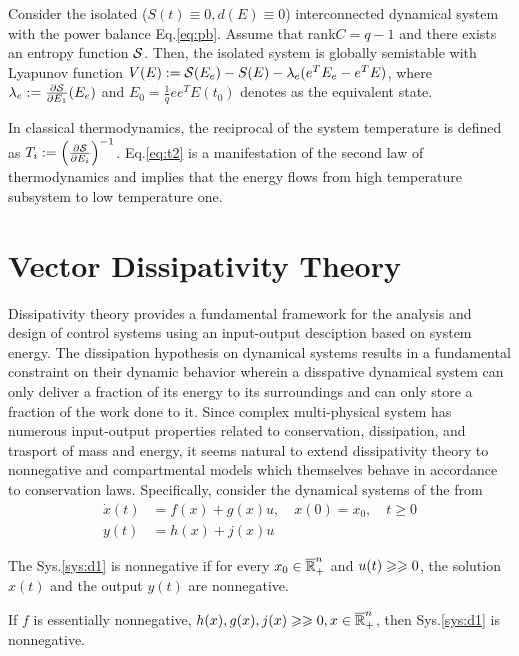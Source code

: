 \documentclass{paper}
\begin{document}
\begin{thm}
Consider the isolated ($S(t)\equiv 0, d(E)\equiv 0$) interconnected dynamical system with the power balance Eq.\ref{eq:pb}.
Assume that rank$C=q-1$ and there exists an entropy function $\mathcal{S}$. Then, the isolated system is globally semistable with
Lyapunov function $V(E):=\mathcal{S}(E_e)-S(E)-\lambda_e(e^TE_e-e^TE)$, where $\lambda_e:=\frac{\partial \mathcal{S}}{\partial E_1}(E_e)$
and $E_0=\frac{1}{q}ee^TE(t_0)$ denotes as the equivalent state.
\end{thm}
In classical thermodynamics, the reciprocal of the system temperature is defined as $T_i:=\left(\frac{\partial \mathcal{S}}
{\partial E_i}\right)^{-1}$. Eq.\ref{eq:t2} is a manifestation of the second law of thermodynamics and implies that the 
energy flows from high temperature subsystem to low temperature one.
\section{Vector Dissipativity Theory}
Dissipativity theory provides a fundamental framework for the analysis and design of control systems using an input-output
desciption based on system energy. The dissipation hypothesis on dynamical systems results in a fundamental constraint
on their dynamic behavior wherein a disspative dynamical system can only deliver a fraction of its energy to its surroundings 
and can only store a fraction of the work done to it. Since complex multi-physical system has numerous input-output 
properties related to conservation, dissipation, and trasport of mass and energy, it seems natural to extend dissipativity 
theory to nonnegative and compartmental models which themselves behave in accordance to conservation laws. Specifically, 
consider the dynamical systems of the from
\begin{align}\label{sys:d1} 
\dot{x}(t)&=f(x)+g(x)u, \quad x(0)=x_0, \quad t\geqslant 0 \\
y(t)&=h(x)+j(x)u \nonumber
\end{align}
\begin{defi}
The Sys.\ref{sys:d1} is nonnegative if for every $x_0\in\overline{\mathbb{R}}_{+}^{n}$ and $u(t)\geqslant\geqslant 0$, the solution $x(t)$ and the output $y(t)$ are
nonnegative.
\end{defi}
\begin{prop}
If $f$ is essentially nonnegative, $h(x),g(x),j(x)\geqslant\geqslant 0, x\in \overline{\mathbb{R}}_{+}^{n}$, then Sys.\ref{sys:d1} is nonnegative.
\end{prop}
\end{document}
